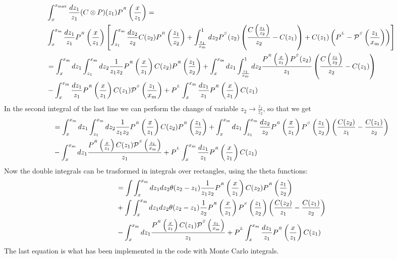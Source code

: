 \documentclass[a4paper]{article}
\newcommand{\PR}[0]{P^{^R}}
\newcommand{\PS}[0]{P^{^S}}
\newcommand{\PmS}[0]{\mathcal{P}^{^S}}
\newcommand{\PL}[0]{P^{^L}}
\newcommand{\xm}[0]{x_{\rm m}}
\newcommand{\zo}[0]{{z_1}}
\newcommand{\zt}[0]{{z_2}}
\begin{document}
\begin{equation*}
	\begin{split}
		& \int_x^{x_{\rm max}} \frac{dz_1}{z_1} (C \otimes P)(z_1) \PR \left(\frac{x}{z_1}\right)  = \\
		&\int_x^{\xm} \frac{dz_1}{z_1}\PR\left(\frac{x}{z_1}\right) \left[ \int_{\zo}^{\xm} \frac{d\zt}{\zt}C(\zt)\PR\left(\frac{\zo}{\zt}\right) +  \int_{\frac{\zo}{\xm}}^{1}d\zt \PS(\zt)\left(\frac{C\left(\frac{\zo}{\zt}\right)}{\zt}-C(\zo)\right) + C(\zo)\left(\PL - \PmS\left(\frac{\zo}{\xm}\right)\right)\right]\\
		&= \int_x^{\xm}d\zo \int_{\zo}^{\xm}d\zt \frac{1}{\zo \zt} \PR \left(\frac{x}{\zo}\right)C(\zt)\PR \left(\frac{\zo}{\zt}\right) + \int_x^{\xm}d\zo \int_{\frac{\zo}{\xm}}^{1}d\zt \frac{\PR\left(\frac{x}{\zo}\right)\PS(\zt)}{\zo} \left( \frac{C\left(\frac{\zo}{\zt}\right)}{\zt} - C(\zo) \right) \\
		&-\int_x^{\xm}\frac{d\zo}{\zo} \PR\left(\frac{x}{\zo}\right) C(\zo)\PmS\left(\frac{\zo}{\xm}\right) + \PL \int_x^{\xm} \frac{d\zo}{\zo} \PR\left(\frac{x}{\zo}\right) C(\zo)
	\end{split}
\end{equation*}
In the second integral of the last line we can perform the change of variable $z_2 \rightarrow \frac{\zo}{\zt}$, so that we get
\begin{equation*}
	\begin{split}
		&= \int_x^{\xm}d\zo \int_{\zo}^{\xm}d\zt \frac{1}{\zo \zt} \PR \left(\frac{x}{\zo}\right)C(\zt)\PR \left(\frac{\zo}{\zt}\right) +\int_x^{\xm}d\zo \int_{\zo}^{\xm}\frac{d\zt}{\zt} \PR\left(\frac{x}{\zo}\right)\PS\left(\frac{\zo}{\zt}\right) \left( \frac{C(\zt)}{\zo} - \frac{C(\zo)}{\zt} \right) \\
		&-\int_x^{\xm}d\zo \frac{\PR\left(\frac{x}{\zo}\right) C(\zo)\PmS\left(\frac{\zo}{\xm}\right)}{\zo} + \PL \int_x^{\xm} \frac{d\zo}{\zo} \PR\left(\frac{x}{\zo}\right) C(\zo)
	\end{split}
\end{equation*}
Now the double integrals can be trasformed in integrals over rectangles, using the theta functions:
\begin{equation}
	\begin{split}
		&= \int\int_x^{\xm}d\zo d\zt \theta(\zt-\zo)\frac{1}{\zo \zt} \PR \left(\frac{x}{\zo}\right)C(\zt)\PR \left(\frac{\zo}{\zt}\right) \\
		& +\int\int_x^{\xm}d\zo d\zt \theta(\zt-\zo)\frac{1}{\zt} \PR\left(\frac{x}{\zo}\right)\PS\left(\frac{\zo}{\zt}\right) \left( \frac{C(\zt)}{\zo} - \frac{C(\zo)}{\zt} \right) \\
		&-\int_x^{\xm}d\zo \frac{\PR\left(\frac{x}{\zo}\right) C(\zo)\PmS\left(\frac{\zo}{\xm}\right)}{\zo} + \PL \int_x^{\xm} \frac{d\zo}{\zo} \PR\left(\frac{x}{\zo}\right) C(\zo)
	\end{split}
\end{equation}
The last equation is what has been implemented in the code with Monte Carlo integrals.
\end{document}

